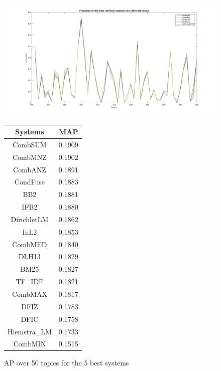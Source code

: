 	\begin{figure}[H]
		\begin{minipage}{0.7\textwidth}				
			\includegraphics[width=\linewidth]{../eval/results-img-graphs/top5.jpg}
			\caption{AP over 50 topics for the 5 best systems}
			\label{fig:top5AP}
		\end{minipage}
		\begin{minipage}{0.3\textwidth}
			\begin{tabular}{c c}
					\toprule
					\textbf{Systems} & \textbf{MAP}\\ \toprule
					CombSUM & 0.1909 \\
					CombMNZ & 0.1902 \\
					CombANZ & 0.1891 \\
					CondFuse & 0.1883 \\
					BB2 & 0.1881 \\
					IFB2 & 0.1880 \\					
					DirichletLM & 0.1862 \\
					InL2 & 0.1853 \\
					CombMED & 0.1840 \\
					DLH13 & 0.1829 \\				
					BM25 & 0.1827 \\
					TF\_IDF & 0.1821\\
					CombMAX & 0.1817 \\
					DFIZ & 0.1783 \\					
					DFIC & 0.1758 \\				
					Hiemstra\_LM & 0.1733 \\
					CombMIN & 0.1515 \\							
					\bottomrule
				\end{tabular}
			\label{tab:17SysMAP}
		\end{minipage}			
	\end{figure}

